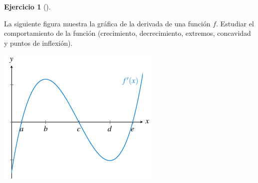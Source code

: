 \documentclass[
  a4paper,
]{scrreport}
\theoremstyle{definition}
\newtheorem{exercise}{Ejercicio}[chapter]
\theoremstyle{remark}
\begin{document}
\begin{exercise}[]\protect\hypertarget{exr-extremos-1}{}\label{exr-extremos-1}

La siguiente figura muestra la gráfica de la derivada de una función
\(f\). Estudiar el comportamiento de la función (crecimiento,
decrecimiento, extremos, concavidad y puntos de inflexión).

\includegraphics{./img/derivadas/grafica-ext-1.png}

\end{exercise}
\end{document}
